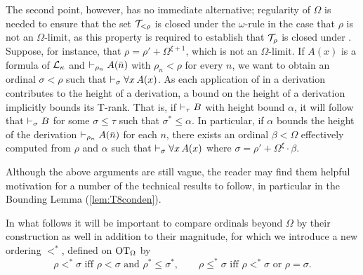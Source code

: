 \documentclass[UKenglish,cleveref,DIV=12]{scrartcl}
\theoremstyle{definition}
\theoremstyle{definition}
\begin{document}
The second point, however, has no immediate alternative; regularity
of $\Omega$ is needed to ensure that the set $\mathcal{T}_{<\rho}$ is closed under the $\omega$-rule
in the case that $\rho$ is not an $\Omega$-limit, as this property is required to establish that
$\mathcal{T}_\rho$ is closed under \Conec\eta. 
Suppose, for instance, that 
$\rho=\rho'+\Omega^{\xi+1}$, which is not an $\Omega$-limit. 
If $A(x)$ is a formula of
$\mathcal{L}_\kappa$ and $\vdash_{\rho_n}  A(\bar n)$ with $\rho_n<\rho$ for every
$n$, we want to obtain an ordinal $\sigma<\rho$ such that
$\vdash_\sigma \forall x\, A(x)$.
%
As each application of \Nec\eta{} in a derivation contributes to the height of a
derivation, a bound on the height of a derivation implicitly bounds its T-rank.
That is, if $\vdash_\tau  B$ with height bound $\alpha$, it will follow that 
$\vdash_{\sigma}  B$ for some \( \sigma \le \tau \) such that $\sigma^* \le \alpha $.
In particular, if $\alpha$ bounds the height of the derivation $\vdash_{\rho_n}  A(\bar n)$ for each
$n$, there exists an ordinal \( \beta < \Omega \) effectively computed from \( \rho \) and \( \alpha \)
such that 
$\vdash_\sigma  \forall x\,A(x)$ where 
$\sigma=\rho'+\Omega^\xi\cdot\beta$.

Although the above arguments are still vague, the reader may find them helpful motivation for a number of the technical results to follow, in particular in the Bounding Lemma (\cref{lem:T8conden}).

In what follows it will be important to compare ordinals beyond $\Omega$ by their construction as well in addition to their magnitude, for which we introduce a new ordering $<^*$, defined on $\mathrm{OT}_\Omega$ by
\[
  \rho<^*\sigma \text{ iff }\rho<\sigma \text{ and }\rho^*\le\sigma^*,
  \qquad
  \rho\le^*\sigma \text{ iff } \rho<^*\sigma \text{ or }\rho=\sigma.
\]
\end{document}
